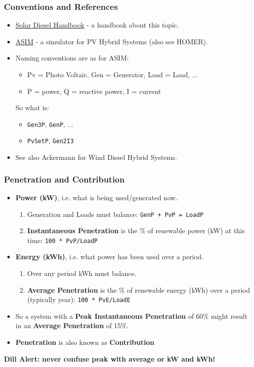 \documentclass{beamer}
\def\dill#1{\textcolor{RawSienna}{\textbf{Dill Alert: #1}}}
\begin{document}
\begin{frame}\frametitle{Conventions and References}
  \begin{itemize}
  \item \href{http://www.powerwater.com.au/solardiesel}{Solar
      Diesel Handbook} - a handbook about this topic.
    \pause
  \item \href{http://www.powerwater.com.au/solardiesel}{ASIM} - a
    simulator for PV Hybrid Systems (also see HOMER).
    \pause
  \item Naming conventions are as for ASIM: 
    \begin{itemize}
    \item Pv = Photo Voltaic, Gen = Generator, Load = Load, ...
    \item P = power, Q = reactive power, I = current
    \end{itemize}
    So what is:
    \begin{itemize}
    \item \texttt{Gen3P}, \texttt{GenP}, ...
    \item \texttt{PvSetP}, \texttt{Gen2I3}
    \end{itemize}
    \pause 
  \item See also Ackermann for Wind Diesel Hybrid Systems.
  \end{itemize}
\end{frame}

\begin{frame}\frametitle{Penetration and Contribution}
  \begin{itemize}
  \item \textbf{Power (kW)}, i.e. what is being used/generated now.
    \pause
    \begin{enumerate}
    \item Generation and Loads must balance: \texttt{GenP + PvP = LoadP}
    \item \textbf{Instantaneous Penetration} is the 
      \% of renewable power (kW) at this time: \texttt{100 * PvP/LoadP}
    \end{enumerate}
    \pause
  \item \textbf{Energy (kWh)}, i.e. what power has been used over a
    period.
    \pause
    \begin{enumerate}
    \item Over any period kWh must balance.
    \item \textbf{Average Penetration} is the \% of renewable energy
      (kWh) over a period (typically year): \texttt{100 * PvE/LoadE}
    \end{enumerate}
    \pause
  \item So a system with a \textbf{Peak Instantaneous Penetration} of
    60\% might result in an \textbf{Average Penetration} of 15\%.
  \item \textbf{Penetration} is also known as \textbf{Contribution}
    \pause
  \end{itemize}
  \dill{never confuse peak with average or kW and kWh!}

\end{frame}
\end{document}
